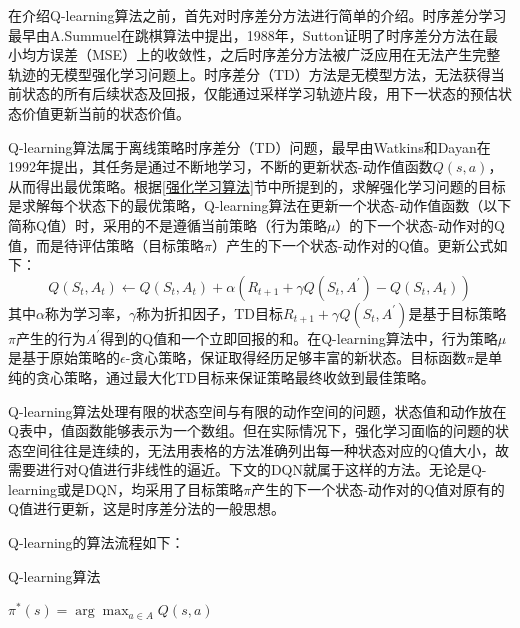 在介绍Q-learning算法之前，首先对时序差分方法进行简单的介绍。时序差分学习最早由A.Summuel在跳棋算法中提出，1988年，Sutton证明了时序差分方法在最小均方误差（MSE）上的收敛性\cite{1998Reinforcement}，之后时序差分方法被广泛应用在无法产生完整轨迹的无模型强化学习问题上。时序差分（TD）方法是无模型方法，无法获得当前状态的所有后续状态及回报，仅能通过采样学习轨迹片段，用下一状态的预估状态价值更新当前的状态价值。

Q-learning算法属于离线策略时序差分（TD）问题，最早由Watkins和Dayan在1992年提出\cite{1992Technical}，其任务是通过不断地学习，不断的更新状态-动作值函数$Q(s,a)$，从而得出最优策略。根据\ref{强化学习算法}节中所提到的，求解强化学习问题的目标是求解每个状态下的最优策略，Q-learning算法在更新一个状态-动作值函数（以下简称Q值）时，采用的不是遵循当前策略（行为策略$\mu$）的下一个状态-动作对的Q值，而是待评估策略（目标策略$\pi$）产生的下一个状态-动作对的Q值。更新公式如下：
\begin{equation}\label{Q-learning}
    Q(S_t, A_t) \gets Q(S_t, A_t) + \alpha (R_{t+1}+\gamma Q(S_t, A^{'}) - Q(S_t, A_t))
\end{equation}
其中$\alpha$称为学习率，$\gamma$称为折扣因子，TD目标$R_{t+1}+\gamma Q(S_t, A^{'})$是基于目标策略$\pi$产生的行为$A^{'}$得到的Q值和一个立即回报的和。在Q-learning算法中，行为策略$\mu$是基于原始策略的$\epsilon$-贪心策略，保证取得经历足够丰富的新状态。目标函数$\pi$是单纯的贪心策略，通过最大化TD目标来保证策略最终收敛到最佳策略。

Q-learning算法处理有限的状态空间与有限的动作空间的问题，状态值和动作放在Q表中，值函数能够表示为一个数组。但在实际情况下，强化学习面临的问题的状态空间往往是连续的，无法用表格的方法准确列出每一种状态对应的Q值大小，故需要进行对Q值进行非线性的逼近。下文的DQN就属于这样的方法。无论是Q-learning或是DQN，均采用了目标策略$\pi$产生的下一个状态-动作对的Q值对原有的Q值进行更新，这是时序差分法的一般思想。

Q-learning的算法流程如下：

\begin{algorithm}[H]  
	\caption{Q-learning算法}%
    $\pi^{*}(s) = \arg \max_{a \in A} Q(s,a)$\;
\end{algorithm}

